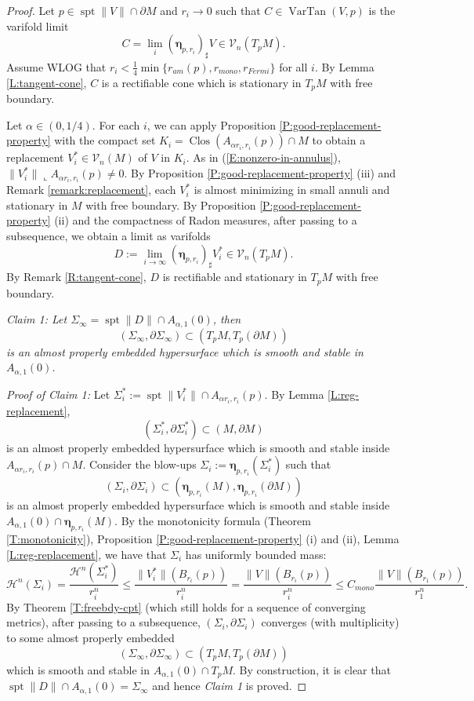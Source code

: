 \documentclass[10pt]{amsart}
\theoremstyle{definition}
\theoremstyle{remark}
\numberwithin{equation}{section}
\newcommand{\al}{\alpha}
\newcommand{\V}{\mathcal{V}}
\newcommand{\lc}{\llcorner}
\newcommand{\Si}{\Sigma}
\newcommand{\bleta}{\boldsymbol \eta}
\newcommand{\VarTan}{\operatorname{VarTan}}
\newcommand{\spt}{\operatorname{spt}}
\newcommand{\Clos}{\operatorname{Clos}}
\begin{document}
\begin{proof}
Let $p \in \spt\|V\| \cap \partial M$ and $r_i \to 0$ such that $C \in \VarTan(V,p)$ is the varifold limit
\[ C= \lim_i (\bleta_{p,r_i})_\sharp V \in \V_n(T_pM).\]
Assume WLOG that $r_i < \frac{1}{4}\min\{r_{am}(p),r_{mono},r_{Fermi}\}$ for all $i$. 
By Lemma \ref{L:tangent-cone}, $C$ is a rectifiable cone which is stationary in $T_pM$ with free boundary. 

Let $\al\in(0, 1/4)$. For each $i$, we can apply Proposition \ref{P:good-replacement-property} with the compact set $K_i=\Clos(A_{\al r_i, r_i}(p)) \cap M$ to obtain a replacement $V^*_i \in \V_n(M)$ of $V$ in $K_i$. As in (\ref{E:nonzero-in-annulus}), $\|V^*_i\| \lc A_{\al r_i,r_i}(p) \neq 0$. By Proposition \ref{P:good-replacement-property} (iii) and Remark \ref{remark:replacement}, each $V^*_i$ is almost minimizing in small annuli and stationary in $M$ with free boundary. By Proposition \ref{P:good-replacement-property} (ii) and the compactness of Radon measures, after passing to a subsequence, we obtain a limit as varifolds
\[ D:=\lim_{i\to \infty} (\bleta_{p,r_i})_\sharp V^*_i   \in \V_n(T_pM). \]
By Remark \ref{R:tangent-cone}, $D$ is rectifiable and stationary in $T_pM$ with free boundary. 

\vspace{.3cm}

\textit{Claim 1:  Let $\Si_\infty=\spt\|D\| \cap A_{\al, 1}(0)$, then 
\[ (\Sigma_\infty,\partial \Sigma_\infty) \subset ( T_p M,T_p (\partial M))\]
is an almost properly embedded hypersurface which is smooth and stable in $A_{\al,1}(0)$.} 

\vspace{.3cm}

\textit{Proof of Claim 1: } Let $\Si_i^*:=\spt \|V^*_i\| \cap A_{\al r_i, r_i}(p)$. By Lemma \ref{L:reg-replacement}, 
\[ (\Si_i^*,\partial \Si_i^*) \subset (M, \partial M)\]
is an almost properly embedded hypersurface which is smooth and stable inside $A_{\al r_i, r_i}(p) \cap M$.
Consider the blow-ups $\Si_i:=\bleta_{p,r_i}(\Si_i^*)$ such that 
\[ (\Si_i,\partial \Si_i) \subset ( \bleta_{p,r_i}(M),\bleta_{p,r_i}(\partial M))\]
is an almost properly embedded hypersurface which is smooth and stable inside $A_{\al,1}(0) \cap \bleta_{p,r_i}(M)$. By the monotonicity formula (Theorem \ref{T:monotonicity}), Proposition \ref{P:good-replacement-property} (i) and (ii), Lemma \ref{L:reg-replacement}, we have that $\Sigma_i$ has uniformly bounded mass:
\[ \mathcal{H}^n(\Si_i)= \frac{\mathcal{H}^n(\Si^*_i)}{r_i^n}\leq \frac{\|V^*_i\|(B_{r_i}(p))}{r_i^n}=  \frac{\|V\|(B_{r_i}(p))}{r_i^n}\leq C_{mono} \frac{\|V\|(B_{r_1}(p))}{r_1^n}.\]
By Theorem \ref{T:freebdy-cpt} (which still holds for a sequence of converging metrics), after passing to a subsequence, 
$(\Si_i,\partial \Si_i)$ converges (with multiplicity) to some almost properly embedded 
\[ (\Si_\infty,\partial \Si_\infty) \subset (T_p M,T_p(\partial M))\]
which is smooth and stable in $A_{\al, 1}(0)\cap T_p M$. 
By construction, it is clear that $\spt \|D\| \cap A_{\al, 1}(0)=\Si_\infty$ and hence \emph{Claim 1} is proved. 


\end{proof}
\end{document}
